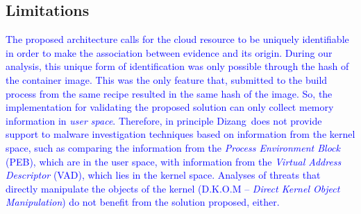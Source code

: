 \documentclass[conference]{IEEEtran}
\newcommand{\marcos}[1]{{\color{green}{MARCOS: #1}}}
\newcommand{\fancyname}{Dizang}
\begin{document}
\subsection{Limitations}
\marcos{Me parece uma boa discussão como trabalho futuro, não exatamente como ``limitação''.}
\textcolor{blue}{The proposed architecture calls for the cloud resource to be uniquely identifiable in order to make the association between evidence and its origin.
%
During our analysis, this unique form of identification was only possible through the hash of the container image. 
%
This was the only feature that, submitted to the build process from the same recipe resulted in the same hash of the image.
%
So, the implementation for validating the proposed solution can only collect memory information in \textit{user space}.
%
Therefore, in principle \fancyname\ does not provide support to malware investigation techniques based on information from the kernel space, such as comparing the information from the \textit{Process Environment Block} (PEB), which are in the user space, with information from the \textit{Virtual Address Descriptor} (VAD), which lies in the kernel space. 
%
Analyses of threats that directly manipulate the objects of the kernel (D.K.O.M – \textit{Direct Kernel Object Manipulation}) do not benefit from the solution proposed, either.}


%
%

\end{document}
